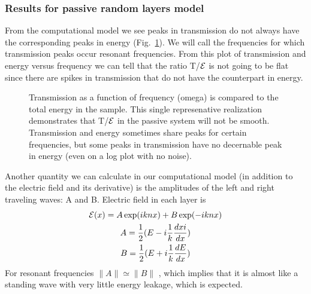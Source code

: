 \subsubsection {Results for passive random layers model}

From the computational model we see peaks in transmission do not always have the corresponding peaks in energy (Fig.~\ref{fig:tenkenergytransmission}). We will call the frequencies for which transmission peaks occur resonant frequencies. From this plot of transmission and energy versus frequency we can tell that the ratio T/${\cal E}$ is not going to be flat since there are spikes in transmission that do not have the counterpart in energy.

\begin{figure}
\vskip -0.5cm
\vskip -0.5cm
\caption{Transmission as a function of frequency (omega) is compared to the total energy in the sample. This single represenative realization demonstrates that T/${\cal E}$ in the passive system will not be smooth. Transmission and energy sometimes share peaks for certain frequencies, but some peaks in transmission have no decernable peak in energy (even on a log plot with no noise).
}
\label{fig:tenkenergytransmission}
\end{figure}

Another quantity we can calculate in our computational model (in addition to the electric field and its derivative) is the amplitudes of the left and right traveling waves: A and B. Electric field in each layer is
\begin{equation}
\begin{gathered}
{\cal E}(x) = A \exp(i k n x) + B \exp(-i k n x) \\
A = \frac{1}{2} (E - i \frac{1}{k} \frac{dxi}{dx}) \\
B = \frac{1}{2} (E + i \frac{1}{k} \frac{dE}{dx})
\end{gathered}
\end{equation}
For resonant frequencies $ \| A \| \simeq \| B \| $ , which implies that it is almost like a standing wave with very little energy leakage, which is expected.


